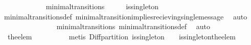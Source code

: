 \begin{isabellebody}
\isamarkupfalse%
\ {\isacharminus}\isanewline
\ \ \isamarkupfalse%
\ {\isasymsigma}\ {\isasymsigma}{\isacharprime}\isanewline
\ \ \isamarkupfalse%
\ {\isachardoublequoteopen}{\isacharparenleft}{\isasymsigma}{\isacharcomma}\ {\isasymsigma}{\isacharprime}{\isacharparenright}\ {\isasymin}\ minimal{\isacharunderscore}transitions{\isachardoublequoteclose}\isanewline
\ \ \isamarkupfalse%
\ \isamarkupfalse%
\ {\isachardoublequoteopen}is{\isacharunderscore}singleton\ {\isacharparenleft}{\isasymsigma}{\isacharprime}{\isacharminus}\ {\isasymsigma}{\isacharparenright}{\isachardoublequoteclose}\isanewline
\ \ \ \ \isamarkupfalse%
\ \ minimal{\isacharunderscore}transitions{\isacharunderscore}def\ minimal{\isacharunderscore}transition{\isacharunderscore}implies{\isacharunderscore}recieving{\isacharunderscore}single{\isacharunderscore}message\ \isamarkupfalse%
\ auto\ \isanewline
\ \ \isamarkupfalse%
\ \isamarkupfalse%
\ {\isachardoublequoteopen}{\isasymsigma}\ {\isasymsubseteq}\ {\isasymsigma}{\isacharprime}{\isachardoublequoteclose}\isanewline
\ \ \ \ \isamarkupfalse%
\ {\isacartoucheopen}{\isacharparenleft}{\isasymsigma}{\isacharcomma}\ {\isasymsigma}{\isacharprime}{\isacharparenright}\ {\isasymin}\ minimal{\isacharunderscore}transitions{\isacartoucheclose}\ minimal{\isacharunderscore}transitions{\isacharunderscore}def\ \isamarkupfalse%
\ auto\isanewline
\ \ \isamarkupfalse%
\ \isamarkupfalse%
\ {\isachardoublequoteopen}{\isasymsigma}\ {\isasymunion}\ {\isacharbraceleft}the{\isacharunderscore}elem\ {\isacharparenleft}{\isasymsigma}{\isacharprime}{\isacharminus}\ {\isasymsigma}{\isacharparenright}{\isacharbraceright}\ {\isacharequal}\ {\isasymsigma}{\isacharprime}{\isachardoublequoteclose}\isanewline
\ \ \ \ \isamarkupfalse%
\ {\isacharparenleft}metis\ Diff{\isacharunderscore}partition\ {\isacartoucheopen}is{\isacharunderscore}singleton\ {\isacharparenleft}{\isasymsigma}{\isacharprime}\ {\isacharminus}\ {\isasymsigma}{\isacharparenright}{\isacartoucheclose}\ is{\isacharunderscore}singleton{\isacharunderscore}the{\isacharunderscore}elem{\isacharparenright}\isanewline
{}\isamarkupfalse%
%
\endisatagproof
{\isafoldproof}%
%
\isadelimproof
\isanewline
%
\endisadelimproof
%
\isadelimtheory
\isanewline
%
\endisadelimtheory
%
\isatagtheory
{}\isamarkupfalse%
%
\endisatagtheory
{\isafoldtheory}%
%
\isadelimtheory
%
\endisadelimtheory
%
\end{isabellebody}%
